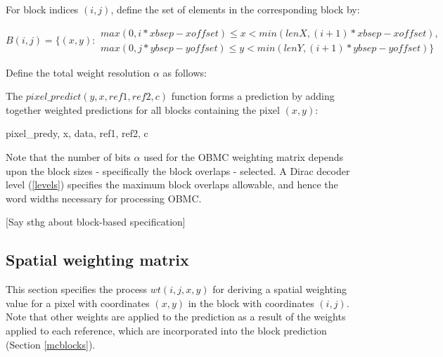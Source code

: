 For block indices $(i,j)$, define the set of elements in the corresponding
block by:

\begin{equation*}
B(i,j)=\{(x,y): 
\begin{array}{l}
 max(0,i*xbsep-xoffset)\leq x<min(lenX,(i+1)*xbsep-xoffset), \\
 max(0,j*ybsep-yoffset)\leq y<min(lenY,(i+1)*ybsep-yoffset)\}
\end{array}
\end{equation*}

Define the total weight resolution $\alpha$ as follows: 

\begin{pseudo*}
\end{pseudo*}

The $pixel\_predict(y, x, ref1, ref2, c)$ function forms a prediction by adding together weighted predictions
for all blocks containing the pixel $(x,y)$:

\begin{pseudo}{pixel\_pred}{y, x, data, ref1, ref2, c}
\bsEND
{}
\end{pseudo}

\begin{informative}
Note that the number of bits $\alpha$ used for the OBMC weighting matrix depends upon the block sizes - specifically
the block overlaps - selected. A Dirac decoder level (\ref{levels}) specifies the maximum block overlaps allowable, and hence 
the word widths necessary for processing OBMC.

[Say sthg about block-based specification]
\end{informative}

\subsection{Spatial weighting matrix}

\label{mcspatialweights}

This section specifies the process $wt(i,j,x,y)$ for deriving a spatial weighting value for a pixel with
coordinates $(x,y)$ in the block with coordinates $(i,j)$. Note that other weights are applied
to the prediction as a result of the weights applied to each reference, which are incorporated
into the block prediction (Section \ref{mcblocks}).

